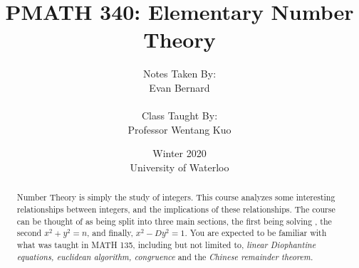 \documentclass[11pt]{report}
\title{\textbf{PMATH 340: Elementary Number Theory}}
\author{Notes Taken By:\\Evan Bernard\\\\Class Taught By:\\Professor Wentang Kuo}
\date{Winter 2020\\ University of Waterloo}
\begin{document}
\maketitle
\tableofcontents

\begin{abstract}
Number Theory is simply the study of integers. This course analyzes some interesting relationships between integers, and the implications of these relationships. The course can be thought of as being split into three main sections, the first being solving , the second $x^2+y^2=n$, and finally, $x^2-Dy^2=1$. You are expected to be familiar with what was taught in MATH 135, including but not limited to, \textit{linear Diophantine equations, euclidean algorithm, congruence} and the \textit{Chinese remainder theorem.}
\end{abstract}







\end{document}
